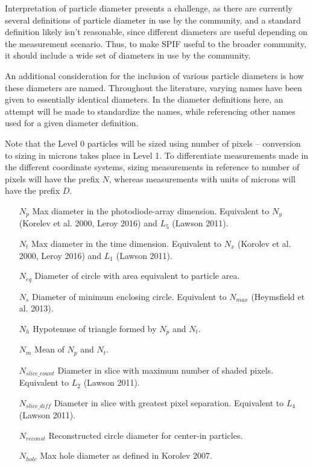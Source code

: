 \documentclass[12pt,a4paper]{article}
\begin{document}
Interpretation of particle diameter presents a challenge, as there are currently several definitions of particle diameter in use by the community, and a standard definition likely isn't reasonable, since different diameters are useful depending on the measurement scenario. Thus, to make SPIF useful to the broader community, it should include a wide set of diameters in use by the community.

An additional consideration for the inclusion of various particle diameters is how these diameters are named. Throughout the literature, varying names have been given to essentially identical diameters. In the diameter definitions here, an attempt will be made to standardize the names, while referencing other names used for a given diameter definition.

Note that the Level 0 particles will be sized using number of pixels -- conversion to sizing in microns takes place in Level 1. To differentiate measurements made in the different coordinate systems, sizing measurements in reference to number of pixels will have the prefix $N$, whereas measurements with units of microns will have the prefix $D$.

\begin{itemize}
\item [$N_p$] Max diameter in the photodiode-array dimension. Equivalent to $N_y$ (Korelev et al. 2000, Leroy 2016) and $L_5$ (Lawson 2011).
\item[$N_t$] Max diameter in the time dimension. Equivalent to $N_x$ (Korolev et al. 2000, Leroy 2016) and $L_1$ (Lawson 2011).
\item[$N_{eq}$] Diameter of circle with area equivalent to particle area.
\item[$N_s$] Diameter of minimum enclosing circle. Equivalent to $N_{max}$ (Heymsfield et al. 2013).
\item[$N_h$] Hypotenuse of triangle formed by $N_p$ and $N_t$.
\item[$N_m$] Mean of $N_p$ and $N_t$.
\item[$N_{slice\_count}$] Diameter in slice with maximum number of shaded pixels. Equivalent to $L_2$ (Lawson 2011).
\item[$N_{slice\_diff}$] Diameter in slice with greatest pixel separation. Equivalent to $L_4$ (Lawson 2011).
\item[$N_{reconst}$] Reconstructed circle diameter for center-in particles.
\item[$N_{hole}$] Max hole diameter as defined in Korolev 2007.
\end{itemize}
\end{document}
